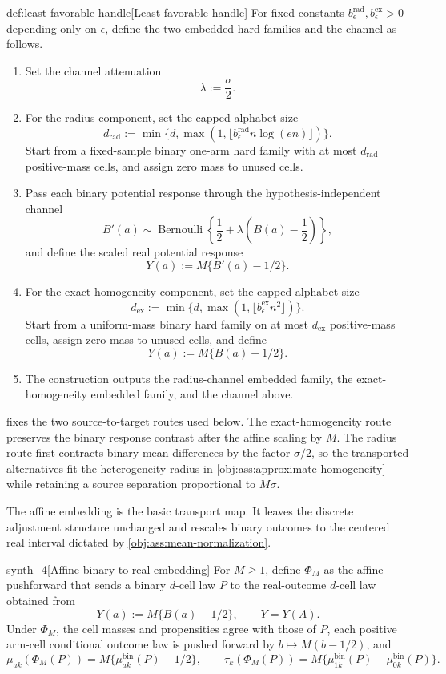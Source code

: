 \begin{algorithmv}{def:least-favorable-handle}[Least-favorable handle]
For fixed constants \(b_{\epsilon}^{\mathrm{rad}},b_{\epsilon}^{\mathrm{ex}}>0\) depending only on \(\epsilon\), define the two embedded hard families and the channel as follows.
\begin{enumerate}
\item Set the channel attenuation
\[
\lambda:=\frac{\sigma}{2}.
\]
\item For the radius component, set the capped alphabet size
\[
d_{\mathrm{rad}}:=\min\{d,\max(1,\lfloor b_{\epsilon}^{\mathrm{rad}}n\log(en)\rfloor)\}.
\]
Start from a fixed-sample binary one-arm hard family with at most \(d_{\mathrm{rad}}\) positive-mass cells, and assign zero mass to unused cells.
\item Pass each binary potential response through the hypothesis-independent channel
\[
B'(a)\sim\operatorname{Bernoulli}\!\left\{\frac12+\lambda\left(B(a)-\frac12\right)\right\},
\]
and define the scaled real potential response
\[
Y(a):=M\{B'(a)-1/2\}.
\]
\item For the exact-homogeneity component, set the capped alphabet size
\[
d_{\mathrm{ex}}:=\min\{d,\max(1,\lfloor b_{\epsilon}^{\mathrm{ex}}n^2\rfloor)\}.
\]
Start from a uniform-mass binary hard family on at most \(d_{\mathrm{ex}}\) positive-mass cells, assign zero mass to unused cells, and define
\[
Y(a):=M\{B(a)-1/2\}.
\]
\item The construction outputs the radius-channel embedded family, the exact-homogeneity embedded family, and the channel above.
\end{enumerate}
\end{algorithmv}

 fixes the two source-to-target routes used below. The exact-homogeneity route preserves the binary response contrast after the affine scaling by \(M\). The radius route first contracts binary mean differences by the factor \(\sigma/2\), so the transported alternatives fit the heterogeneity radius in \cref{obj:ass:approximate-homogeneity} while retaining a source separation proportional to \(M\sigma\).

The affine embedding is the basic transport map. It leaves the discrete adjustment structure unchanged and rescales binary outcomes to the centered real interval dictated by \cref{obj:ass:mean-normalization}.

\begin{definitionv}{synth_4}[Affine binary-to-real embedding]
For \(M\ge1\), define \(\Phi_M\) as the affine pushforward that sends a binary \(d\)-cell law \(P\) to the real-outcome \(d\)-cell law obtained from
\[
Y(a):=M\{B(a)-1/2\},
\qquad
Y=Y(A).
\]
Under \(\Phi_M\), the cell masses and propensities agree with those of \(P\), each positive arm-cell conditional outcome law is pushed forward by \(b\mapsto M(b-1/2)\), and
\[
\mu_{ak}(\Phi_M(P))=M\{\mu_{ak}^{\mathrm{bin}}(P)-1/2\},
\qquad
\tau_k(\Phi_M(P))=M\{\mu_{1k}^{\mathrm{bin}}(P)-\mu_{0k}^{\mathrm{bin}}(P)\}.
\]
\end{definitionv}

